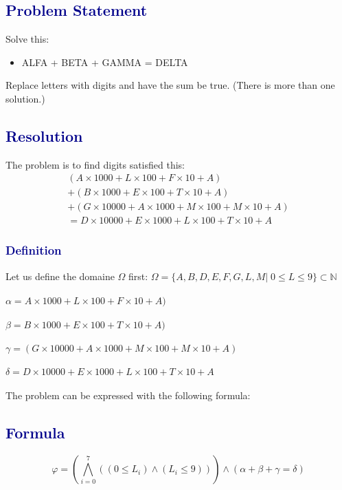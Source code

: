 \documentclass[12pt]{article}
\theoremstyle{definition}
\theoremstyle{plain}
\begin{document}
\subsection*{\textcolor{darkblue}{Problem Statement}}

\vspace{0.5cm}
\begin{tcolorbox}[colback=lightgray, colframe=darkblue, boxrule=1pt]
Solve this:
\begin{itemize}
  \item ALFA + BETA + GAMMA = DELTA
\end{itemize}
Replace letters with digits and have the sum be true. (There is more than one solution.)
\end{tcolorbox}
\subsection*{\textcolor{darkblue}{Resolution}}
The problem is to find digits satisfied this: \\
\begin{align}
  (A\times 1000 + L\times 100 + F\times 10 + A)\\
  +
  (B\times 1000 + E\times 100 + T\times 10 + A)\\
  +
  (G\times 10000 + A\times 1000 + M\times 100 + M\times 10 + A) \\= D\times 10000 + E\times 1000 + L\times 100 + T\times 10 + A
\end{align}
\subsubsection*{\textcolor{darkblue}{Definition}}
Let us define the domaine $\Omega$ first: 
$\Omega = \{ A, B, D, E, F, G, L, M  |\; 0 \leq L \leq 9\} \subset \mathbb{N}$\\\\
$\alpha = A\times 1000 + L\times 100 + F\times 10 + A)$\\\\
$\beta = B\times 1000 + E\times 100 + T\times 10 + A)$\\\\
$\gamma =  (G\times 10000 + A\times 1000 + M\times 100 + M\times 10 + A)$\\\\
$\delta = D\times 10000 + E\times 1000 + L\times 100 + T\times 10 + A$\\\\
The problem can be expressed with the following formula:
\subsection*{\textcolor{darkblue}{Formula}}
\begin{equation}
  \varphi = \left(\bigwedge^7_{i=0}((0 \leq L_i)\wedge(L_i \leq 9))\right)\wedge \left( \alpha + \beta + \gamma = \delta \right)
\end{equation}
\end{document}
